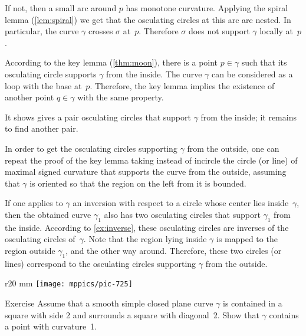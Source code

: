 If not, then a small arc around $p$ has monotone curvature.
Applying the spiral lemma (\ref{lem:spiral}) we get that the osculating circles at this arc are nested.
In particular, the curve $\gamma$ crosses $\sigma$ at~$p$. 
Therefore $\sigma$ does not support $\gamma$ locally at~$p$.
\qeds





According to the key lemma (\ref{thm:moon}), there is a point $p\in\gamma$ such that its osculating circle supports $\gamma$ from the inside.
The curve $\gamma$ can be considered as a loop with the base at~$p$.
Therefore, the key lemma implies the existence of another point $q\in\gamma$ with the same property.

It shows gives a pair osculating circles that support $\gamma$ from the inside;
it remains to find another pair.

In order to get the osculating circles supporting $\gamma$ from the outside, one can repeat the proof of the key lemma taking instead of incircle the circle (or line) of maximal signed curvature that supports the curve from the outside, assuming that $\gamma$ is oriented so that the region on the left from it is bounded.\qeds

If one applies to $\gamma$ an inversion with respect to a circle whose center lies inside~$\gamma$, then the obtained curve $\gamma_1$ also has  two osculating circles that support $\gamma_1$ from the inside.
According to \ref{ex:inverse}, these osculating circles are inverses of the osculating circles of~$\gamma$.
Note that the region lying inside $\gamma$ is mapped to the region outside $\gamma_1$, and the other way around.
Therefore, these two circles (or lines) correspond to the osculating circles supporting $\gamma$ from the outside.\qeds



{

\begin{wrapfigure}{r}{20 mm}
\vskip-6mm
\centering
\texttt{[image: mppics/pic-725]}
\vskip0mm
\end{wrapfigure}

\begin{thm}{Exercise}\label{ex:2-squares}
Assume that a smooth simple closed plane curve \(\gamma\) is contained in a square with side 2 and surrounds a square with diagonal~2.
Show that \(\gamma\) contains a point with curvature~1.
\end{thm}

}

